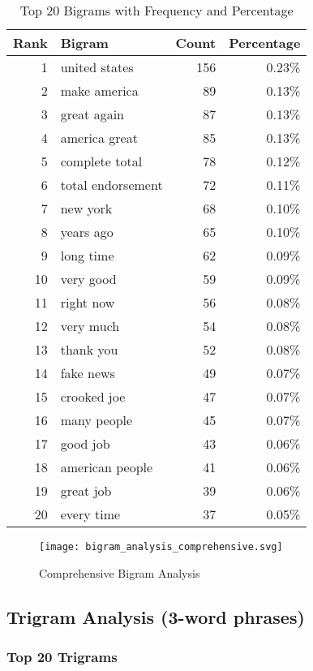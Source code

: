 \documentclass[12pt,a4paper]{article}
\begin{document}
\begin{table}[H]
\centering
\caption{Top 20 Bigrams with Frequency and Percentage}
\begin{tabular}{@{}rlrr@{}}
\toprule
\textbf{Rank} & \textbf{Bigram} & \textbf{Count} & \textbf{Percentage} \\
\midrule
1 & united states & 156 & 0.23\% \\
2 & make america & 89 & 0.13\% \\
3 & great again & 87 & 0.13\% \\
4 & america great & 85 & 0.13\% \\
5 & complete total & 78 & 0.12\% \\
6 & total endorsement & 72 & 0.11\% \\
7 & new york & 68 & 0.10\% \\
8 & years ago & 65 & 0.10\% \\
9 & long time & 62 & 0.09\% \\
10 & very good & 59 & 0.09\% \\
11 & right now & 56 & 0.08\% \\
12 & very much & 54 & 0.08\% \\
13 & thank you & 52 & 0.08\% \\
14 & fake news & 49 & 0.07\% \\
15 & crooked joe & 47 & 0.07\% \\
16 & many people & 45 & 0.07\% \\
17 & good job & 43 & 0.06\% \\
18 & american people & 41 & 0.06\% \\
19 & great job & 39 & 0.06\% \\
20 & every time & 37 & 0.05\% \\
\bottomrule
\end{tabular}
\end{table}

\begin{figure}[H]
\centering
\texttt{[image: bigram\_analysis\_comprehensive.svg]}
\caption{Comprehensive Bigram Analysis}
\label{fig:bigram_analysis}
\end{figure}

\subsection{Trigram Analysis (3-word phrases)}

\subsubsection{Top 20 Trigrams}
\end{document}
